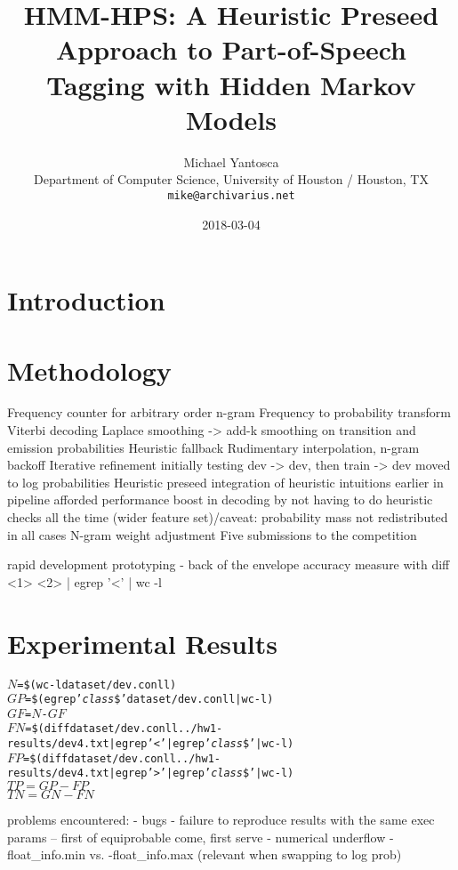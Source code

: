 \documentclass[11pt,a4paper]{article}
\title{HMM-HPS: A Heuristic Preseed Approach to Part-of-Speech Tagging with Hidden Markov Models}
\author{Michael Yantosca \\
  Department of Computer Science, University of Houston / Houston, TX \\
  {\tt mike@archivarius.net} \\}
\date{2018-03-04}
\begin{document}
\maketitle
\begin{abstract}
\end{abstract}

\section{Introduction}

\section{Methodology}

Frequency counter for arbitrary order n-gram
Frequency to probability transform
Viterbi decoding
Laplace smoothing -> add-k smoothing on transition and emission probabilities
Heuristic fallback
Rudimentary interpolation, n-gram backoff
Iterative refinement initially testing dev -> dev, then train -> dev
moved to log probabilities
Heuristic preseed
integration of heuristic intuitions earlier in pipeline afforded performance boost in decoding by not having to do heuristic checks all the time (wider feature set)/caveat: probability mass not redistributed in all cases
N-gram weight adjustment
Five submissions to the competition

rapid development prototyping - back of the envelope accuracy measure with diff <1> <2> | egrep '<' | wc -l

\section{Experimental Results}

\begin{alltt}
  $N$ = \$(wc -l dataset/dev.conll)
  $GP$ = \$(egrep '\emph{class}\$' dataset/dev.conll | wc -l)
  $GF$ = $N$ - $GF$
  $FN$ = \$(diff dataset/dev.conll ../hw1-results/dev4.txt | egrep '<' | egrep '\emph{class}\$' | wc -l)
  $FP$ = \$(diff dataset/dev.conll ../hw1-results/dev4.txt | egrep '>' | egrep '\emph{class}\$' | wc -l)
  $TP = GP - FP$
  $TN = GN - FN$
\end{alltt}

problems encountered:
- bugs
- failure to reproduce results with the same exec params
-- first of equiprobable come, first serve
- numerical underflow
- float\_info.min vs. -float\_info.max (relevant when swapping to log prob)
\end{document}
